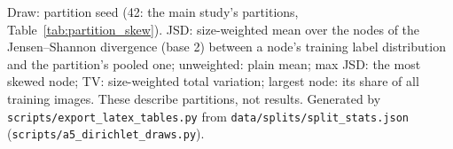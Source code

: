 \documentclass[journal]{IEEEtran}
\begin{document}
\begin{table}[t]
\centering
\caption{Measured Label Skew and Size Imbalance of Every Dirichlet Draw (Training Splits)}
\label{tab:a5_skew}
\setlength{\tabcolsep}{4pt}
{\footnotesize
}
\vspace{2pt}
\parbox{\textwidth}{\footnotesize Draw: partition seed (42: the main study's partitions, Table~\ref{tab:partition_skew}). JSD: size-weighted mean over the nodes of the Jensen--Shannon divergence (base 2) between a node's training label distribution and the partition's pooled one; unweighted: plain mean; max JSD: the most skewed node; TV: size-weighted total variation; largest node: its share of all training images. These describe partitions, not results. Generated by \texttt{scripts/export\_latex\_tables.py} from \texttt{data/splits/split\_stats.json} (\texttt{scripts/a5\_dirichlet\_draws.py}).}
\end{table}
\end{document}
